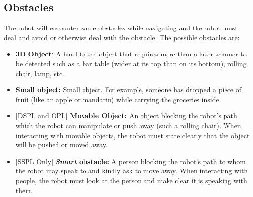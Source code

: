 \subsection{Obstacles}
The robot will encounter some obstacles while navigating and the robot must deal and avoid or otherwise deal with the obstacle. 
The possible obstacles are:
\begin{itemize}
  \item \textbf{3D Object:} A hard to see object that requires more than a laser scanner to be detected such as a bar table (wider at its top than on its bottom), rolling chair, lamp, etc.

  \item \textbf{Small object:} Small object. For example, someone has dropped a piece of fruit (like an apple or mandarin) while carrying the groceries inside.

  \item {[DSPL and OPL]} \textbf{Movable Object:} An object blocking the robot's path which the robot can manipulate or push away (such a rolling chair). When interacting with movable objects, the robot must state clearly that the object will be pushed or moved away.

  \item {[SSPL Only]} \textbf{\textit{Smart} obstacle:} A person blocking the robot's path to whom the robot may speak to and kindly ask to move away. When interacting with people, the robot must look at the person and make clear it is speaking with them.
\end{itemize}



